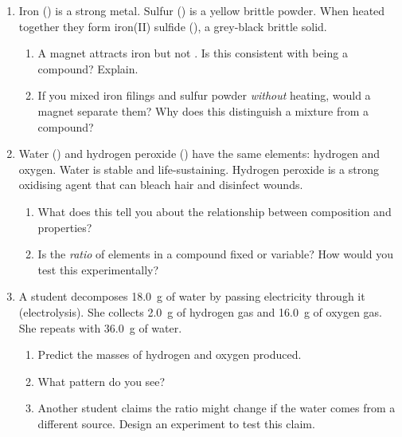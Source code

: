 \documentclass[12pt, a4paper]{book}
\theoremstyle{definition}
\begin{document}
\begin{deepbox}
\begin{enumerate}[label=\textbf{D\arabic*.}]
  \item Iron () is a strong metal. Sulfur () is a
        yellow brittle powder. When heated together they form
        iron(II) sulfide (), a grey-black brittle solid.
        \begin{enumerate}[label=(\alph*)]
          \item A magnet attracts iron but not .
                Is this consistent with  being a compound?
                Explain.
          \item If you mixed iron filings and sulfur powder
                \emph{without} heating, would a magnet separate them?
                Why does this distinguish a mixture from a compound?
        \end{enumerate}

  \item Water () and hydrogen peroxide ()
        have the same elements: hydrogen and oxygen.
        Water is stable and life-sustaining.
        Hydrogen peroxide is a strong oxidising agent that can
        bleach hair and disinfect wounds.
        \begin{enumerate}[label=(\alph*)]
          \item What does this tell you about the relationship
                between composition and properties?
          \item Is the \emph{ratio} of elements in a compound
                fixed or variable? How would you test this experimentally?
        \end{enumerate}

  \item A student decomposes \SI{18.0}{\gram} of water by passing
        electricity through it (electrolysis).
        She collects \SI{2.0}{\gram} of hydrogen gas and
        \SI{16.0}{\gram} of oxygen gas.
        She repeats with \SI{36.0}{\gram} of water.
        \begin{enumerate}[label=(\alph*)]
          \item Predict the masses of hydrogen and oxygen produced.
          \item What pattern do you see?
          \item Another student claims the ratio might change if
                the water comes from a different source.
                Design an experiment to test this claim.
        \end{enumerate}
\end{enumerate}
\end{deepbox}
\end{document}
